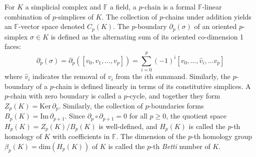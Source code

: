 \documentclass[10pt]{article}
\newcommand{\+}{%
	\raisebox{0.18ex}{\scaleobj{0.55}{+}}
}
\begin{document}
\\
\\
For $K$ a simplicial complex and $\mathbb{F}$ a field, a $p$-chain is a formal $\mathbb{F}$-linear combination of $p$-simplices of $K$. The collection of $p$-chains under addition yields an $\mathbb{F}$-vector space denoted $C_p(K)$. 
The $p$-boundary $\partial_p(\sigma)$ of an oriented $p$-simplex $\sigma\in K$ is defined as the alternating sum of its oriented co-dimension 1 faces:
\begin{equation}\label{eq:alt_sum}
	\partial_p(\sigma) = \partial_p([v_0, v_1, \dots, v_p]) = \sum_{i=0}^p (-1)^i [v_0, \dots, \hat{v}_i, \dots v_p]
\end{equation}
where $\hat{v}_i$ indicates the removal of $v_i$ from the $i$th summand. Similarly, the $p$-boundary of a $p$-chain is defined linearly in terms of its constitutive simplices. 
A $p$-chain with zero boundary is called a $p$-cycle, and together they form $Z_p(K) = \mathrm{Ker}\,\partial_p$. Similarly, the collection of $p$-boundaries forms  $B_p(K) = \mathrm{Im}\,\partial_{p+1}$. Since $\partial_p \circ \partial_{p+1} = 0$ for all $p\geq 0$, the quotient space $H_p(K) = Z_p(K) / B_{p}(K)$ is well-defined, and $H_p(K)$ is called the $p$-th homology of $K$ with coefficients in $\mathbb{F}$. The dimension of the $p$-th homology group $\beta_p(K) = \mathrm{dim}(H_p(K))$ of $K$ is called the $p$-th \emph{Betti} number of $K$. 
\end{document}
